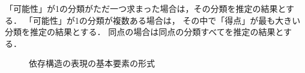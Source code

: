 「可能性」が1の分類がただ一つ求まった場合は，その分類を推定の結果とする．
「可能性」が1の分類が複数ある場合は，
その中で「得点」が最も大きい分類を推定の結果とする．
同点の場合は同点の分類すべてを推定の結果とする．


\begin{figure}[t]
\small
  \begin{center}

  \caption{依存構造の表現の基本要素の形式}
  \label{fig:s_eps}
  \end{center}
\end{figure}

